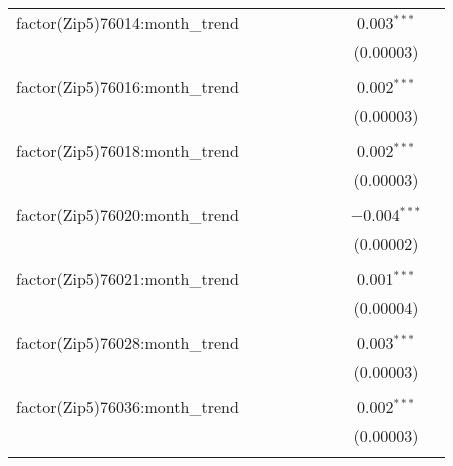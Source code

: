 \begin{table}[H]
{\begin{tabular}{@{\extracolsep{5pt}}lcccccccc}
  factor(Zip5)76014:month\_trend &  &  &  &  &  &  & 0.003$^{***}$ &  \\  

   &  &  &  &  &  &  & (0.00003) &  \\  

   & & & & & & & & \\  

  factor(Zip5)76016:month\_trend &  &  &  &  &  &  & 0.002$^{***}$ &  \\  

   &  &  &  &  &  &  & (0.00003) &  \\  

   & & & & & & & & \\  

  factor(Zip5)76018:month\_trend &  &  &  &  &  &  & 0.002$^{***}$ &  \\  

   &  &  &  &  &  &  & (0.00003) &  \\  

   & & & & & & & & \\  

  factor(Zip5)76020:month\_trend &  &  &  &  &  &  & $-$0.004$^{***}$ &  \\  

   &  &  &  &  &  &  & (0.00002) &  \\  

   & & & & & & & & \\  

  factor(Zip5)76021:month\_trend &  &  &  &  &  &  & 0.001$^{***}$ &  \\  

   &  &  &  &  &  &  & (0.00004) &  \\  

   & & & & & & & & \\  

  factor(Zip5)76028:month\_trend &  &  &  &  &  &  & 0.003$^{***}$ &  \\  

   &  &  &  &  &  &  & (0.00003) &  \\  

   & & & & & & & & \\  

  factor(Zip5)76036:month\_trend &  &  &  &  &  &  & 0.002$^{***}$ &  \\  

   &  &  &  &  &  &  & (0.00003) &  \\  

   & & & & & & & & \\  


\end{tabular}}
\end{table}
